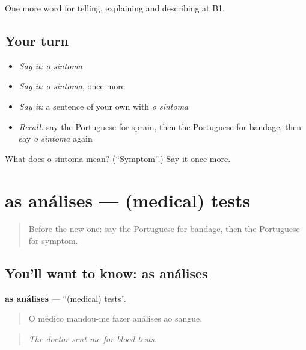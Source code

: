 \begin{grammarlens}[title={What you've built}]
One more word for telling, explaining and describing at B1.
\end{grammarlens}

\subsection*{Your turn}
\begin{itemize}
\raggedright
  \item \emph{Say it:} \emph{o sintoma}
  \item \emph{Say it:} \emph{o sintoma}, once more
  \item \emph{Say it:} a sentence of your own with \emph{o sintoma}
  \item \emph{Recall:} say the Portuguese for sprain, then the Portuguese for bandage, then say \emph{o sintoma} again
\end{itemize}

\begin{tcolorbox}[breakable,colback=teal!4,colframe=teal!35!black,title={Before you move on}]
What does o sintoma mean? (\textquotedblleft{}Symptom\textquotedblright{}.) Say it once more.
\end{tcolorbox}
\section[as análises]{as análises — (medical) tests}

\label{lesson:PT-C487-analises}



\begin{quote}
Before the new one: say the Portuguese for bandage, then the Portuguese for symptom.
\end{quote}

\subsection*{You'll want to know: as análises}
\textbf{as análises} — \textquotedblleft{}(medical) tests\textquotedblright{}.

\begin{quote}
O médico mandou-me fazer análises ao sangue.
\end{quote}

\begin{quote}
\emph{The doctor sent me for blood tests.}
\end{quote}

